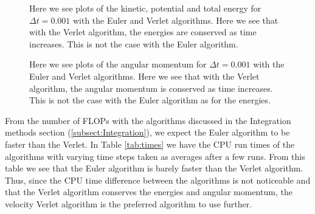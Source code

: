 \documentclass[12pt,a4paper,english]{article}
\begin{document}
\begin{figure}[htbp]
	\hspace{0.5em}
	\caption{Here we see plots of the kinetic, potential and total energy for $\Delta t=0.001$ with the Euler and Verlet algorithms. Here we see that with the Verlet algorithm, the energies are conserved as time increases. This is not the case with the Euler algorithm. \label{fig:Energies}}
\end{figure}

\begin{figure}[htbp]
	\hspace{0.5em}
	\caption{Here we see plots of the angular momentum for $\Delta t=0.001$ with the Euler and Verlet algorithms. Here we see that with the Verlet algorithm, the angular momentum is conserved as time increases. This is not the case with the Euler algorithm as for the energies. \label{fig:Angular}}
\end{figure}

From the number of FLOPs with the algorithms discussed in the Integration methods section (\ref{subsect:Integration}), we expect the Euler algorithm to be faster than the Verlet. In Table \ref{tab:times} we have the CPU run times of the algorithms with varying time steps taken as averages after a few runs. From this table we see that the Euler algorithm is barely faster than the Verlet algorithm. Thus, since the CPU time difference between the algorithms is not noticeable and that the Verlet algorithm conserves the energies and angular momentum, the velocity Verlet algorithm is the preferred algorithm to use further.
\end{document}
